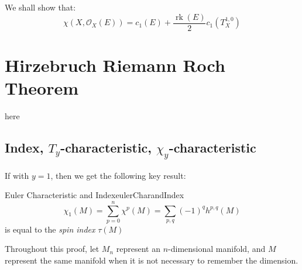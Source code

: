 \documentclass{book}
\newcommand{\CO}{{\mathcal{O}}}
\newcommand{\rk}{{\operatorname{rk}}}
\begin{document}
We shall show that:
  \[
    \chi(X, \CO_X(E)) = c_1(E) + \frac{\rk(E)}{2}c_1(T_X^{1,0})
\]

\section{Hirzebruch Riemann Roch Theorem}\label{sec:HRR}

here
\subsection{Index, $T_y$-characteristic, $\chi_y$-characteristic}

If with $y = 1$, then we get the following key result:
\begin{thm}{Euler Characteristic and Index}{eulerCharandIndex}
  \[
  \chi_1(M) = \sum_{p=0}^n \chi^p(M) = \sum_{p,q}(-1)^qh^{p,q}(M)
\]
is equal to the \emph{spin index} $\tau(M)$%
\end{thm}

Throughout this proof, let $M_n$ represent an $n$-dimensional manifold, and $M$ represent the same manifold
when it is not necessary to remember the dimension.
\end{document}
